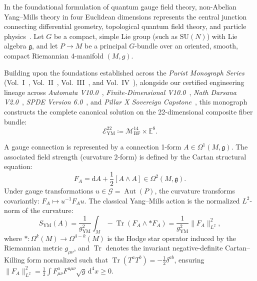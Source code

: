 \documentclass[11pt,a4paper,reqno]{article}
\theoremstyle{plain}
\theoremstyle{definition}
\theoremstyle{remark}
\numberwithin{equation}{section}
\newcommand{\Mbf}{\mathcal{M}_{\mathrm{BF}}^{14}}
\newcommand{\Eym}{\mathcal{E}_{\mathrm{YM}}^{22}}
\providecommand{\diff}{\mathrm{d}}
\providecommand{\Tr}{\operatorname{Tr}}
\begin{document}
In the foundational formulation of quantum gauge field theory, non-Abelian Yang--Mills theory in four Euclidean dimensions represents the central junction connecting differential geometry, topological quantum field theory, and particle physics~\cite{YangMills1954, Donaldson1983}. Let $G$ be a compact, simple Lie group (such as $\mathrm{SU}(N)$) with Lie algebra $\mathfrak{g}$, and let $P \to M$ be a principal $G$-bundle over an oriented, smooth, compact Riemannian 4-manifold $(M, g)$.

Building upon the foundations established across the \emph{Purist Monograph Series} (Vol.~I~\cite{PuristVol1Monograph2026}, Vol.~II~\cite{PuristVol2Monograph2026}, Vol.~III~\cite{PuristVol3Monograph2026}, and Vol.~IV~\cite{RelativisticThreeBody2026}), alongside our certified engineering lineage across \emph{Automata V10.0}~\cite{AutomataV10Monograph2026}, \emph{Finite-Dimensional V10.0}~\cite{FiniteV10Monograph2026}, \emph{Nath Darsana V2.0}~\cite{NathDarsanaV2Monograph2026}, \emph{SPDE Version 6.0}~\cite{SPDEV60}, and \emph{Pillar X Sovereign Capstone}~\cite{PillarXMonograph2026}, this monograph constructs the complete canonical solution on the 22-dimensional composite fiber bundle:
\begin{equation}
  \Eym \coloneqq \Mbf \times \mathbb{E}^8.
  \label{eq:eym_22d_def}
\end{equation}

A gauge connection is represented by a connection 1-form $A \in \Omega^1(M, \mathfrak{g})$. The associated field strength (curvature 2-form) is defined by the Cartan structural equation:
\begin{equation}
  F_A = \diff A + \frac{1}{2} [A \wedge A] \in \Omega^2(M, \mathfrak{g}).
  \label{eq:cartan_curvature}
\end{equation}
Under gauge transformations $u \in \mathcal{G} = \operatorname{Aut}(P)$, the curvature transforms covariantly: $F_A \mapsto u^{-1} F_A u$. The classical Yang--Mills action is the normalized $L^2$-norm of the curvature:
\begin{equation}
  S_{\mathrm{YM}}(A) = \frac{1}{g_{\mathrm{YM}}^2} \int_M -\Tr(F_A \wedge *F_A) = \frac{1}{g_{\mathrm{YM}}^2} \|F_A\|_{L^2}^2,
  \label{eq:ym_action}
\end{equation}
where $*: \Omega^k(M) \to \Omega^{4-k}(M)$ is the Hodge star operator induced by the Riemannian metric $g_{\mu\nu}$, and $\Tr$ denotes the invariant negative-definite Cartan--Killing form normalized such that $\Tr(T^a T^b) = -\frac{1}{2}\delta^{ab}$, ensuring $\|F_A\|_{L^2}^2 = \frac{1}{2}\int F_{\mu\nu}^a F^{a\mu\nu}\sqrt{g}\,\diff^4 x \ge 0$.
\end{document}
